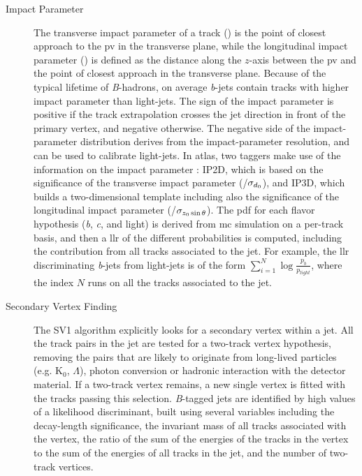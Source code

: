 \begin{description}

\item[Impact Parameter] The transverse impact parameter of a track (\dzero) is the point of closest approach to the 
\gls{pv} in the transverse plane, while the longitudinal impact parameter (\zzerost) is defined as the distance along 
the $z$-axis between the \gls{pv} and the point of closest approach in the transverse plane. Because of the typical 
lifetime of \textit{B}-hadrons, on average \textit{b}-jets contain tracks with higher impact parameter than light-jets. 
The sign of the impact parameter is positive if the track extrapolation crosses the jet direction in front of the primary vertex, and negative otherwise. 
The negative side of the impact-parameter distribution derives from the 
impact-parameter resolution, and can be used to calibrate light-jets. In \gls{atlas}, two taggers make use of the information on the impact parameter
 \cite{ATLAS-CONF-2011-102}: IP2D, which is based on the significance of the transverse impact parameter (\dzero/$\sigma_{{d_0}}$), and IP3D, which builds a two-dimensional template including also the significance of the longitudinal impact parameter (\zzerost/$\sigma_{{z_0} \sin\theta}$). The \gls{pdf} for each flavor hypothesis (\textit{b}, \textit{c}, and light) is derived from \gls{mc} simulation on a per-track basis, and then a \gls{llr} of the different probabilities is computed, including the contribution from all tracks associated to the jet. For example, the \gls{llr} discriminating \textit{b}-jets from light-jets is of the form $\sum_{i=1}^{N}\log\frac{p_b}{p_{light}}$, where the index $N$ runs on all the tracks associated to the jet. 

\item[Secondary Vertex Finding] The SV1 algorithm \cite{ATLAS-CONF-2011-102} explicitly looks for a secondary vertex within a jet. 
All the track pairs in the jet are tested for a two-track vertex hypothesis, removing the pairs that are likely to originate from 
long-lived particles (e.g. K$_0$, $\Lambda$), photon conversion or hadronic interaction with the detector material. 
If a two-track vertex remains, a new single vertex is fitted with the tracks passing this selection. 
\textit{B}-tagged jets are identified by high values of a likelihood discriminant, 
built using several variables 
including the decay-length significance, the invariant mass of all tracks associated with the vertex, 
the ratio of the sum of the energies of the tracks in the vertex to the sum of the energies of all tracks in the jet, 
and the number of two-track vertices.


\end{description}
